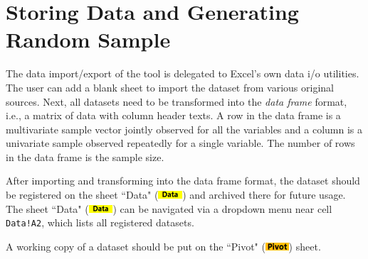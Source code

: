 \documentclass[article]{jss}
\numberwithin{equation}{subsection}
\newcommand{\shtData}{``Data" (\includegraphics[height=8pt, keepaspectratio=true]{DataSheetTab_png}) }
\newcommand{\shtPivot}{``Pivot" (\includegraphics[height=8pt, keepaspectratio=true]{PivotSheetTab_png}) }
\begin{document}
        \section[data]{Storing Data and Generating Random Sample}
        The data import/export of the tool is delegated to Excel's own data i/o utilities. The user can add a blank sheet to import the dataset from various original sources. Next, all datasets need to be transformed into the \textit{data frame} format, i.e., a matrix of data with column header texts. A row in the data frame is a multivariate sample vector jointly observed for all the variables and a column is a univariate sample observed repeatedly for a single variable. The number of rows in the data frame is the sample size.
        
        After importing and transforming into the data frame format, the dataset should be registered on the sheet \shtData and archived there for future usage. The sheet \shtData can be navigated via a dropdown menu near cell \texttt{Data!A2}, which lists all registered datasets. 
        
        A working copy of a dataset should be put on the \shtPivot sheet.
        
\end{document}
